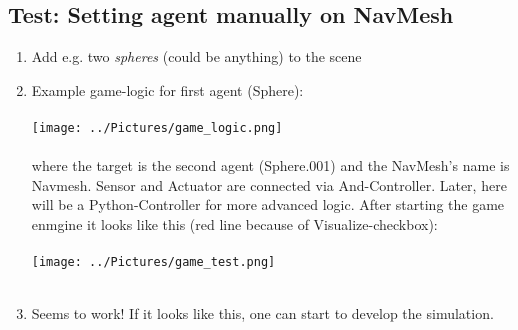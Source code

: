 \documentclass[10pt,a4paper]{article}
\begin{document}
\subsection{Test: Setting agent manually on NavMesh}
\begin{enumerate}
\item Add e.g. two \textit{spheres} (could be anything) to the scene
\item Example game-logic for first agent (Sphere):\\ \vspace{0.05cm}\\ 
\texttt{[image: ../Pictures/game\_logic.png]} \\ \vspace{0.05cm}\\ 
where the target is the second agent (Sphere.001) and the NavMesh's name is Navmesh.
Sensor and Actuator are connected via And-Controller. Later, here will be a Python-Controller for more advanced logic. After starting the game enmgine it looks like this (red line because of Visualize-checkbox): \\ \vspace{0.05cm}\\ 
\texttt{[image: ../Pictures/game\_test.png]}\\ \vspace{0.05cm}\\
\item Seems to work! If it looks like this, one can start to develop the simulation.

\end{enumerate}
\end{document}
